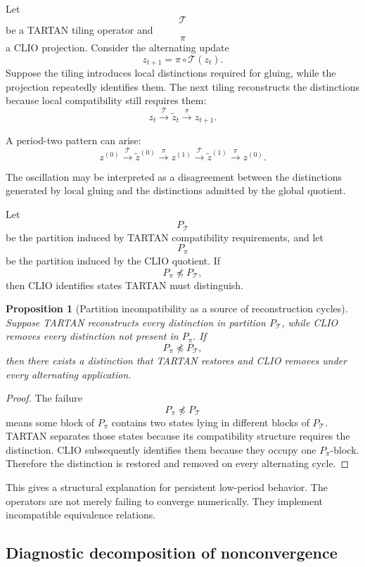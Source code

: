 \documentclass[11pt]{article}
\newtheorem{proposition}[definition]{Proposition}
\theoremstyle{definition}
\begin{document}
Let
\[
\mathcal T
\]
be a TARTAN tiling operator and
\[
\pi
\]
a CLIO projection. Consider the alternating update
\[
z_{t+1}
=
\pi\circ\mathcal T(z_t).
\]
Suppose the tiling introduces local distinctions required for gluing, while the projection repeatedly identifies them. The next tiling reconstructs the distinctions because local compatibility still requires them:
\[
z_t
\xrightarrow{\mathcal T}
\widetilde z_t
\xrightarrow{\pi}
z_{t+1}.
\]

A period-two pattern can arise:
\[
z^{(0)}
\xrightarrow{\mathcal T}
\widetilde z^{(0)}
\xrightarrow{\pi}
z^{(1)}
\xrightarrow{\mathcal T}
\widetilde z^{(1)}
\xrightarrow{\pi}
z^{(0)}.
\]

The oscillation may be interpreted as a disagreement between the distinctions generated by local gluing and the distinctions admitted by the global quotient.

Let
\[
P_{\mathcal T}
\]
be the partition induced by TARTAN compatibility requirements, and let
\[
P_\pi
\]
be the partition induced by the CLIO quotient. If
\[
P_\pi
\not\preceq
P_{\mathcal T},
\]
then CLIO identifies states TARTAN must distinguish.

\begin{proposition}[Partition incompatibility as a source of reconstruction cycles]
Suppose TARTAN reconstructs every distinction in partition \(P_{\mathcal T}\), while CLIO removes every distinction not present in \(P_\pi\). If
\[
P_\pi\not\preceq P_{\mathcal T},
\]
then there exists a distinction that TARTAN restores and CLIO removes under every alternating application.
\end{proposition}

\begin{proof}
The failure
\[
P_\pi\not\preceq P_{\mathcal T}
\]
means some block of \(P_\pi\) contains two states lying in different blocks of \(P_{\mathcal T}\). TARTAN separates those states because its compatibility structure requires the distinction. CLIO subsequently identifies them because they occupy one \(P_\pi\)-block. Therefore the distinction is restored and removed on every alternating cycle.
\end{proof}

This gives a structural explanation for persistent low-period behavior. The operators are not merely failing to converge numerically. They implement incompatible equivalence relations.

\subsection{Diagnostic decomposition of nonconvergence}
\end{document}
